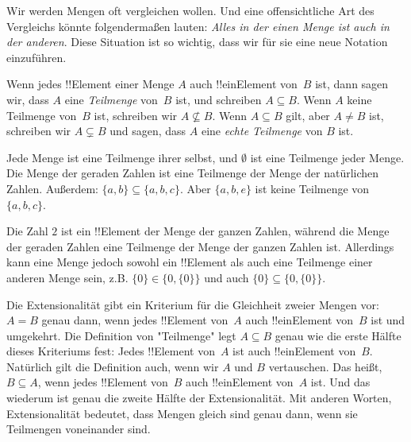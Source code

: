 \documentclass[../../../include/open-logic-section]{subfiles}
\begin{document}

\begin{explain}
Wir werden Mengen oft vergleichen wollen. Und eine offensichtliche Art des Vergleichs
könnte folgendermaßen lauten: \emph{Alles in der einen Menge ist auch in der anderen}.
Diese Situation ist so wichtig, dass wir für sie
eine neue Notation einzuführen.
\end{explain}

\begin{defn}[Teilmenge]
Wenn jedes !!{Element} einer Menge $A$ auch !!ein{Element} von~$B$ ist, dann sagen wir,
dass $A$ eine \emph{Teilmenge} von~$B$ ist, und schreiben $A \subseteq B$. Wenn
$A$ keine Teilmenge von~$B$ ist, schreiben wir $A \not\subseteq B$.
Wenn $A \subseteq B$ gilt, aber $A \neq B$ ist, schreiben wir $A \subsetneq B$ und sagen,
dass $A$ eine \emph{echte Teilmenge} von $B$ ist.
\end{defn}

\begin{ex}
Jede Menge ist eine Teilmenge ihrer selbst, und $\emptyset$ ist eine Teilmenge jeder
Menge. Die Menge der geraden Zahlen ist eine Teilmenge der Menge der natürlichen
Zahlen. Außerdem: $\{ a, b \} \subseteq \{ a, b, c \}$. Aber $\{ a, b, e
\}$ ist keine Teilmenge von $\{ a, b, c \}$.
\end{ex}

\begin{ex}
Die Zahl $2$ ist ein !!{Element} der Menge der ganzen Zahlen, während die
Menge der geraden Zahlen eine Teilmenge der Menge der ganzen Zahlen ist. Allerdings kann eine 
Menge jedoch sowohl ein !!{Element} als auch eine Teilmenge einer anderen Menge sein, z.B. $\{0\} \in \{0, \{0\}\}$ und auch $\{0\} \subseteq \{0,
\{0\}\}$.
\end{ex}

Die Extensionalität gibt ein Kriterium für die Gleichheit zweier Mengen 
vor: $A = B$ genau dann, wenn
jedes !!{Element} von~$A$ auch !!ein{Element} von~$B$ ist und umgekehrt.
Die Definition von "Teilmenge" legt $A \subseteq B$ genau wie die
erste Hälfte dieses Kriteriums fest: Jedes !!{Element} von~$A$ ist auch
!!ein{Element} von~$B$. Natürlich gilt die Definition auch, wenn wir
$A$ und $B$ vertauschen. Das heißt, $B \subseteq A$, wenn jedes !!{Element}
von~$B$ auch !!ein{Element} von~$A$ ist. Und das wiederum ist genau die zweite Hälfte
der Extensionalität. Mit anderen Worten, Extensionalität
bedeutet, dass Mengen gleich sind genau dann, wenn sie Teilmengen voneinander sind.
\end{document}
